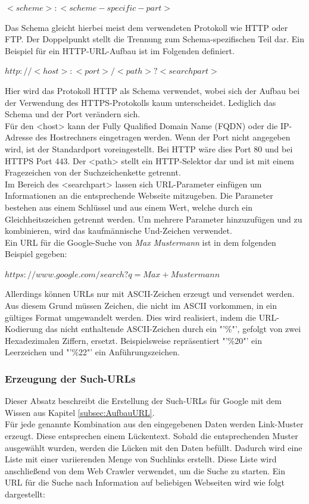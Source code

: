 			$<scheme>:<scheme-specific-part>$ \cite{RFC1738}
			
			Das Schema gleicht hierbei meist dem verwendeten Protokoll wie HTTP oder FTP. Der Doppelpunkt stellt die Trennung zum Schema-spezifischen Teil dar. Ein Beispiel für ein HTTP-URL-Aufbau ist im Folgenden definiert.\cite{RFC1738}
			
			$http://<host>:<port>/<path>?<searchpart>$\cite{RFC1738}
			
			Hier wird das Protokoll HTTP als Schema verwendet, wobei sich der Aufbau bei der Verwendung des HTTPS-Protokolls kaum unterscheidet. Lediglich das Schema und der Port verändern sich.\\
			Für den <host> kann der Fully Qualified Domain Name (FQDN) oder die IP-Adresse des Hostrechners eingetragen werden. Wenn der Port nicht angegeben wird, ist der Standardport voreingestellt. Bei HTTP wäre dies Port 80 und bei HTTPS Port 443. Der <path> stellt ein HTTP-Selektor dar und ist mit einem Fragezeichen von der Suchzeichenkette getrennt.\cite{RFC1738}\\
			Im Bereich des <searchpart> lassen sich URL-Parameter einfügen um Informationen an die entsprechende Webseite mitzugeben. Die Parameter bestehen aus einem Schlüssel und aus einem Wert, welche durch ein Gleichheitszeichen getrennt werden. Um mehrere Parameter hinzuzufügen und zu kombinieren, wird das kaufmännische Und-Zeichen verwendet.\cite{GoogleURL}\\
			Ein URL für die Google-Suche von \textit{Max Mustermann} ist in dem folgenden Beispiel gegeben:
			
			$https://www.google.com/search?q=Max+Mustermann$
			
			Allerdings können URLs nur mit ASCII-Zeichen erzeugt und versendet werden. Aus diesem Grund müssen Zeichen, die nicht im ASCII vorkommen, in ein gültiges Format umgewandelt werden. Dies wird realisiert, indem die URL-Kodierung das nicht enthaltende ASCII-Zeichen durch ein "'\%"', gefolgt von zwei Hexadezimalen Ziffern, ersetzt. Beispielsweise repräsentiert "'\%20"' ein Leerzeichen und "'\%22"' ein Anführungszeichen. \cite{HTMLURL} \\
			
			\subsubsection{Erzeugung der Such-URLs}
			Dieser Absatz beschreibt die Erstellung der Such-URLs für Google mit dem Wissen aus Kapitel \ref{subsec:AufbauURL}.\\
			Für jede genannte Kombination aus den eingegebenen Daten werden Link-Muster erzeugt. Diese entsprechen einem Lückentext. Sobald die entsprechenden Muster ausgewählt wurden, werden die Lücken mit den Daten befüllt. Dadurch wird eine Liste mit einer variierenden Menge von Suchlinks erstellt. Diese Liste wird anschließend von dem Web Crawler verwendet, um die Suche zu starten.
			Ein URL für die Suche nach Information auf beliebigen Webseiten wird wie folgt dargestellt:
					
